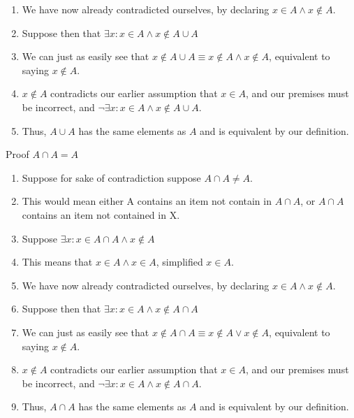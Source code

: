 \documentclass{article}
\begin{document}
\begin{enumerate}
\begin{enumerate}
                \item We have now already contradicted ourselves, by declaring
                    $x \in A \land x \notin A$.
                \item Suppose then that $\exists x : x \in A \land x \notin A \cup A$
                \item We can just as easily see that $x \notin A \cup A \equiv
                    x \notin A \land x \notin A$, equivalent to saying $x
                    \notin A$.
                \item $x \notin A$ contradicts our earlier assumption that $x \in A$, and our
                    premises must be incorrect, and $\neg\exists x : x \in A \land x \notin A \cup A$.
                \item Thus, $A \cup A$ has the same elements as $A$ and is
                    equivalent by our definition.
            \end{enumerate}
            Proof $A \cap A = A$
            \begin{enumerate}
                \item Suppose for sake of contradiction suppose $A \cap A \neq A$.
                \item This would mean either A contains an item not contain in
                    $A \cap A$, or $A \cap A$ contains an item not contained in
                    X.
                \item Suppose $\exists x : x \in A \cap A \land x \notin A$
                \item This means that $x \in A \land x \in A$, simplified $x
                    \in A$.
                \item We have now already contradicted ourselves, by declaring
                    $x \in A \land x \notin A$.
                \item Suppose then that $\exists x : x \in A \land x \notin A \cap A$
                \item We can just as easily see that $x \notin A \cap A \equiv
                    x \notin A \lor x \notin A$, equivalent to saying $x \notin
                    A$.
                \item $x \notin A$ contradicts our earlier assumption that $x \in A$, and our
                    premises must be incorrect, and $\neg\exists x : x \in A \land x \notin A \cap A$.
                \item Thus, $A \cap A$ has the same elements as $A$ and is
                    equivalent by our definition.

\end{enumerate}
\end{enumerate}
\end{document}
